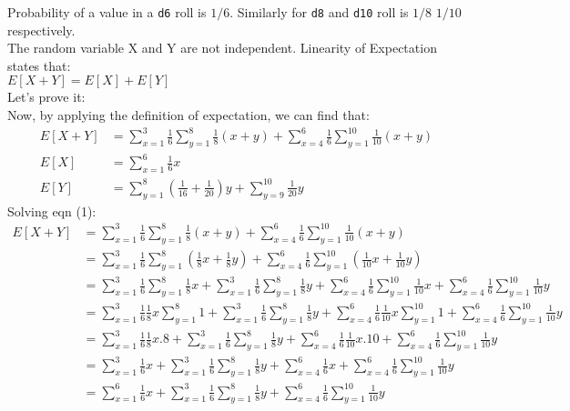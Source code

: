 \documentclass[addpoints]{exam}
\begin{document}
\begin{questions}
\begin{parts}
\begin{solution}
Probability of a value in a \texttt{d6} roll is $1/6$. Similarly for \texttt{d8} and \texttt{d10} roll is $1/8$ $1/10$ respectively.\\

The random variable X and Y are not independent.
Linearity of Expectation states that:\\
$E[X + Y] = E[X] + E[Y]$\\
Let's prove it:\\
Now, by applying the definition of expectation, we can find that:
\begin{align}
E[X+Y] &= \sum_{x=1}^3 \frac{1}{6} \sum_{y=1}^8 \frac{1}{ 8} (x+y) + \sum_{x=4}^{6}\frac{1}{6}\sum_{y=1}^{10}\frac {1}{10}(x+y)\\
E[X] &= \sum_{x=1}^{6} \tfrac 1 6 x\\
E[Y] &= \sum_{y=1}^8 (\tfrac 1{16}+\tfrac 1{20})y +\sum_{y=9}^{10}\tfrac{1}{20} y
\end{align}
Solving eqn (1):\\
\begin{align*}
E[X+Y] &= \sum_{x=1}^3 \frac{1}{6} \sum_{y=1}^8 \frac{1}{ 8} (x+y) + \sum_{x=4}^{6}\frac{1}{6}\sum_{y=1}^{10}\frac {1}{10}(x+y)\\
&= \sum_{x=1}^3 \frac{1}{6} \sum_{y=1}^8  \left(\frac{1}{ 8} x+ \frac{1}{ 8} y\right) + \sum_{x=4}^{6}\frac{1}{6}\sum_{y=1}^{10}\left(\frac {1}{10}x + \frac {1}{10}y\right)\\
&= \sum_{x=1}^3 \frac{1}{6} \sum_{y=1}^8 \frac{1}{ 8} x+ \sum_{x=1}^3 \frac{1}{6} \sum_{y=1}^8  \frac{1}{ 8} y + \sum_{x=4}^{6}\frac{1}{6}\sum_{y=1}^{10}\frac {1}{10}x + \sum_{x=4}^{6}\frac{1}{6}\sum_{y=1}^{10} \frac {1}{10}y\\
&= \sum_{x=1}^3 \frac{1}{6} \frac{1}{ 8} x \sum_{y=1}^8 1+ \sum_{x=1}^3 \frac{1}{6} \sum_{y=1}^8  \frac{1}{ 8} y + \sum_{x=4}^{6}\frac{1}{6} \frac {1}{10}x\sum_{y=1}^{10} 1 + \sum_{x=4}^{6}\frac{1}{6}\sum_{y=1}^{10} \frac {1}{10}y\\
&= \sum_{x=1}^3 \frac{1}{6} \frac{1}{ 8} x .8+ \sum_{x=1}^3 \frac{1}{6} \sum_{y=1}^8  \frac{1}{ 8} y + \sum_{x=4}^{6}\frac{1}{6} \frac {1}{10}x.10 + \sum_{x=4}^{6}\frac{1}{6}\sum_{y=1}^{10} \frac {1}{10}y\\
&= \sum_{x=1}^3 \frac{1}{6}  x + \sum_{x=1}^3 \frac{1}{6} \sum_{y=1}^8  \frac{1}{ 8} y + \sum_{x=4}^{6}\frac{1}{6} x + \sum_{x=4}^{6}\frac{1}{6}\sum_{y=1}^{10} \frac {1}{10}y\\
&= \sum_{x=1}^6 \frac{1}{6} x+ \sum_{x=1}^3 \frac{1}{6} \sum_{y=1}^8  \frac{1}{ 8} y + \sum_{x=4}^{6}\frac{1}{6}\sum_{y=1}^{10} \frac {1}{10}y\\

\end{align*}
\end{solution}
\end{parts}
\end{questions}
\end{document}
